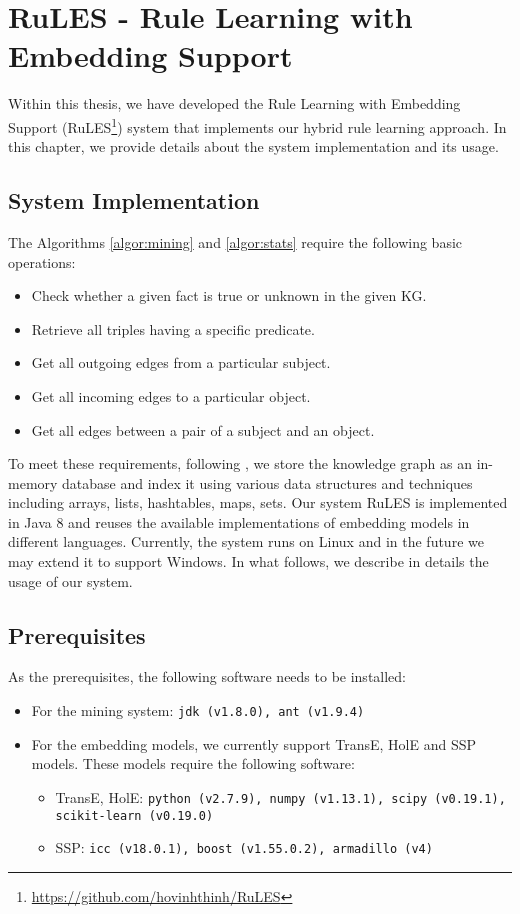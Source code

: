 \chapter{RuLES - Rule Learning with Embedding Support}
\label{chapter:impl}
Within this thesis, we have developed the Rule Learning with Embedding Support (RuLES\footnote{\url{https://github.com/hovinhthinh/RuLES}}) system that implements our hybrid rule learning approach. In this chapter, we provide details about the system implementation and its usage.

\section{System Implementation}
The Algorithms \ref{algor:mining} and \ref{algor:stats} require the following basic operations:
\begin{itemize}
\item Check whether a given fact is true or unknown in the given KG.
\item Retrieve all triples having a specific predicate.
\item Get all outgoing edges from a particular subject.
\item Get all incoming edges to a particular object.
\item Get all edges between a pair of a subject and an object.
\end{itemize}

To meet these requirements, following \cite{amie}, we store the knowledge graph as an in-memory database and index it using various data structures and techniques including arrays, lists, hashtables, maps, sets. Our system RuLES is implemented in Java 8 and reuses the available implementations of embedding models in different languages. Currently, the system runs on Linux and in the future we may extend it to support Windows. In what follows, we describe in details the usage of our system.
\section{Prerequisites}
As the prerequisites, the following software needs to be installed:
\begin{itemize}
\item For the mining system: \texttt{jdk (v1.8.0), ant (v1.9.4)}
\item For the embedding models, we currently support TransE, HolE and SSP models. These models require the following software:
\begin{itemize}
\item TransE, HolE: \texttt{python (v2.7.9), numpy (v1.13.1), scipy (v0.19.1),}\\ \texttt{scikit-learn (v0.19.0)}
\item SSP: \texttt{icc (v18.0.1), boost (v1.55.0.2), armadillo (v4)}
\end{itemize}
\end{itemize}
